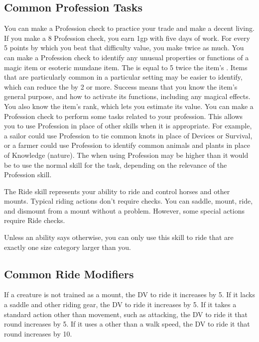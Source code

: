   \subsection{Common Profession Tasks}
     You can make a Profession check to practice your trade and make a decent living.
    If you make a  8 Profession check, you earn 1gp with five days of work.
    For every 5 points by which you beat that difficulty value, you make twice as much.
     You can make a Profession check to identify any unusual properties or functions of a magic item or esoteric mundane item.
    The  is equal to 5 \add twice the item's .
    Items that are particularly common in a particular setting may be easier to identify, which can reduce the  by 2 or more.
    Success means that you know the item's general purpose, and how to activate its functions, including any magical effects.
    You also know the item's rank, which lets you estimate its value.
     You can make a Profession check to perform some tasks related to your profession.
    This allows you to use Profession in place of other skills when it is appropriate.
    For example, a sailor could use Profession to tie common knots in place of Devices or Survival, or a farmer could use Profession to identify common animals and plants in place of Knowledge (nature).
    The  when using Profession may be higher than it would be to use the normal skill for the task, depending on the relevance of the Profession skill.

\newpage
{}
  The Ride skill represents your ability to ride and control horses and other mounts.
  Typical riding actions don't require checks. You can saddle, mount, ride, and dismount from a mount without a problem. However, some special actions require Ride checks.

  Unless an ability says otherwise, you can only use this skill to ride  that are exactly one size category larger than you.

  \subsection{Common Ride Modifiers}
    If a creature is not trained as a mount, the DV to ride it increases by 5.
    If it lacks a saddle and other riding gear, the DV to ride it increases by 5.
    If it takes a standard action other than movement, such as attacking, the DV to ride it that round increases by 5.
    If it uses a  other than a walk speed, the DV to ride it that round increases by 10.

